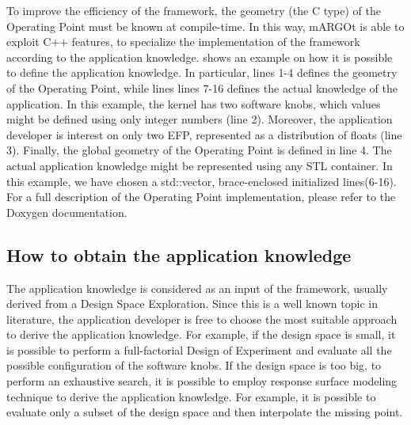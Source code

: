 To improve the efficiency of the framework, the geometry (the C type) of the Operating Point must be known at compile-time.
In this way, mARGOt is able to exploit C++ features, to specialize the implementation of the framework according to the application knowledge.
 shows an example on how it is possible to define the application knowledge.
In particular, lines 1-4 defines the geometry of the Operating Point, while lines lines 7-16 defines the actual knowledge of the application.
In this example, the kernel has two software knobs, which values might be defined using only integer numbers (line 2).
Moreover, the application developer is interest on only two EFP, represented as a distribution of floats (line 3).
Finally, the global geometry of the Operating Point is defined in line 4.
The actual application knowledge might be represented using any STL container.
In this example, we have chosen a std::vector, brace-enclosed initialized lines(6-16).
For a full description of the Operating Point implementation, please refer to the Doxygen documentation.


\subsection{How to obtain the application knowledge}

The application knowledge is considered as an input of the framework, usually derived from a Design Space Exploration.
Since this is a well known topic in literature, the application developer is free to choose the most suitable approach to derive the application knowledge.
For example, if the design space is small, it is possible to perform a full-factorial Design of Experiment and evaluate all the possible configuration of the software knobs.
If the design space is too big, to perform an exhaustive search, it is possible to employ response surface modeling technique to derive the application knowledge.
For example, it is possible to evaluate only a subset of the design space and then interpolate the missing point.


